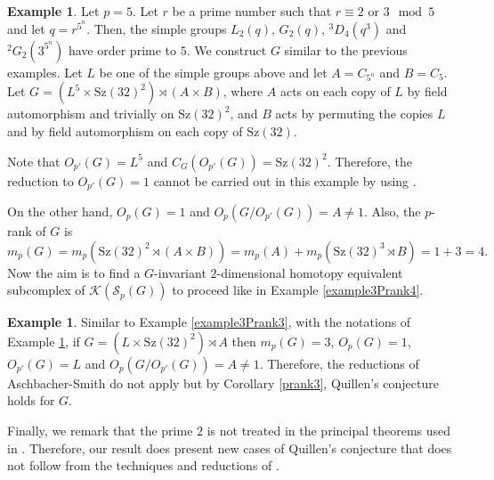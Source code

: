 \documentclass[11pt,twoside,reqno]{amsart}
\theoremstyle{plain}
\theoremstyle{definition}
\newtheorem{example}[theorem]{Example}
\theoremstyle{remark}
\def\K{\mathcal{K}}
\def\S{\mathcal{S}}
\def\Sz{\mathrm{Sz}}
\begin{document}
\begin{example}\label{example5Prank4}
Let $p = 5$. Let $r$ be a prime number such that $r\equiv 2$ or $3\mod 5$ and let $q = r^{5^n}$.
Then, the simple groups $L_2(q)$, $G_2(q)$, ${}^3D_4(q^3)$ and ${}^2G_2(3^{5^n})$ have order prime to $5$.
We construct $G$ similar to the previous examples.
Let $L$ be one of the simple groups above and let $A = C_{5^n}$ and $B = C_5$.
Let $G = (L^5 \times \Sz(32)^2)\rtimes (A\times B)$, where $A$ acts on each copy of $L$ by field automorphism and trivially on $\Sz(32)^2$, and $B$ acts by permuting the copies $L$ and by field automorphism on each copy of $\Sz(32)$.

Note that $O_{p'}(G) = L^5$ and $C_G(O_{p'}(G)) = \Sz(32)^2$.
Therefore, the reduction to $O_{p'}(G) = 1$ cannot be carried out in this example by using \cite[Proposition 1.6]{AschbacherSmith}.

On the other hand, $O_p(G) = 1$ and $O_p(G/O_{p'}(G)) = A\neq 1$.
Also, the $p$-rank of $G$ is
\[m_p(G) = m_p(\Sz(32)^2\rtimes (A\times B)) = m_p(A) + m_p(\Sz(32)^3\rtimes B) = 1 + 3 = 4.\]
Now the aim is to find a $G$-invariant $2$-dimensional homotopy equivalent subcomplex of $\K(\S_p(G))$ to proceed like in Example \ref{example3Prank4}.
\end{example}

\begin{example}\label{example5Prank3}
Similar to Example \ref{example3Prank3}, with the notations of Example \ref{example5Prank4}, if $G = (L\times \Sz(32)^2)\rtimes A$ then $m_p(G) = 3$, $O_p(G) = 1$, $O_{p'}(G) = L$ and $O_p(G/O_{p'}(G)) = A\neq 1$. Therefore, the reductions of Aschbacher-Smith do not apply but by Corollary \ref{prank3}, Quillen's conjecture holds for $G$.
\end{example}

Finally, we remark that the prime $2$ is not treated in the principal theorems used in \cite{AschbacherSmith}.
Therefore, our result does present new cases of Quillen's conjecture that does not follow from the techniques and reductions of \cite{AschbacherSmith}.


\end{document}
